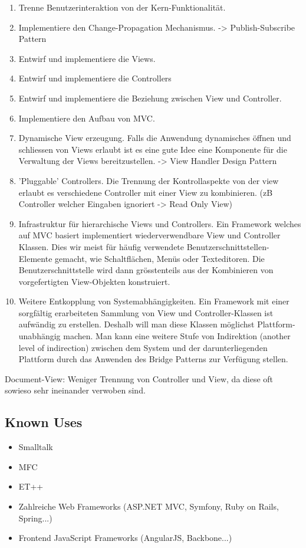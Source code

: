 \begin{enumerate}
	\item  Trenne Benutzerinteraktion von der Kern-Funktionalität.
	\item  Implementiere den Change-Propagation Mechanismus. -> Publish-Subscribe Pattern
	\item  Entwirf und implementiere die Views.
	\item  Entwirf und implementiere die Controllers
	\item  Entwirf und implementiere die Beziehung zwischen View und Controller.
	\item  Implementiere den Aufbau von MVC.
	\item  Dynamische View erzeugung. Falls die Anwendung dynamisches öffnen und schliessen von Views erlaubt ist es eine gute Idee eine Komponente für die Verwaltung der Views bereitzustellen. -> View Handler Design Pattern
	\item  'Pluggable' Controllers. Die Trennung der Kontrollaspekte von der view erlaubt es verschiedene Controller mit einer View zu kombinieren. (zB Controller welcher Eingaben ignoriert -> Read Only View)
	\item  Infrastruktur für hierarchische Views und Controllers. Ein Framework welches auf MVC basiert implementiert wiederverwendbare View und Controller Klassen. Dies wir meist für häufig verwendete Benutzerschnittstellen-Elemente gemacht, wie Schaltflächen, Menüs oder Texteditoren. Die Benutzerschnittstelle wird dann grösstenteils aus der Kombinieren von vorgefertigten View-Objekten konstruiert.
	\item Weitere Entkopplung von Systemabhängigkeiten. Ein Framework mit einer sorgfältig erarbeiteten Sammlung von View und Controller-Klassen ist aufwändig zu erstellen. Deshalb will man diese Klassen möglichst Plattform-unabhängig machen. Man kann eine weitere Stufe von Indirektion (another level of indirection) zwischen dem System und der darunterliegenden Plattform durch das Anwenden des Bridge Patterns zur Verfügung stellen.
\end{enumerate}


Document-View: Weniger Trennung von Controller und View, da diese oft sowieso sehr ineinander verwoben sind.

\subsection*{Known Uses}


\begin{itemize}
	\item Smalltalk
	\item MFC
	\item ET++
	\item Zahlreiche Web Frameworks (ASP.NET MVC, Symfony, Ruby on Rails, Spring...)
	\item Frontend JavaScript Frameworks (AngularJS, Backbone...)
\end{itemize}

